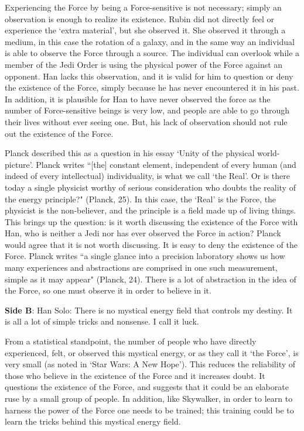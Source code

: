 \documentclass[11pt, oneside]{article}
\begin{document}
\par Experiencing the Force by being a Force-sensitive is not necessary; simply an observation is enough to realize its existence. Rubin did not directly feel or experience the `extra material', but she observed it. She observed it through a medium, in this case the rotation of a galaxy, and in the same way an individual is able to observe the Force through a source. The individual can overlook while a member of the Jedi Order is using the physical power of the Force against an opponent. Han lacks this observation, and it is valid for him to question or deny the existence of the Force, simply because he has never encountered it in his past. In addition, it is plausible for Han to have never observed the force as the number of Force-sensitive beings is very low, and people are able to go through their lives without ever seeing one. But, his lack of observation should not rule out the existence of the Force.

\par Planck described this as a question in his essay `Unity of the physical world-picture'. Planck writes ``[the] constant element, independent of every human (and indeed of every intellectual) individuality, is what we call `the Real'. Or is there today a single physicist worthy of serious consideration who doubts the reality of the energy principle?" (Planck, 25). In this case, the `Real' is the Force, the physicist is the non-believer, and the principle is a field made up of living things. This brings up the question: is it worth discussing the existence of the Force with Han, who is neither a Jedi nor has ever observed the Force in action? Planck would agree that it is not worth discussing. It is easy to deny the existence of the Force. Planck writes ``a single glance into a precision laboratory shows us how many experiences and abstractions are comprised in one such measurement, simple as it may appear" (Planck, 24). There is a lot of abstraction in the idea of the Force, so one must observe it in order to believe in it.

\newpage 

\noindent \textbf{Side B}: Han Solo: There is no mystical energy field that controls my destiny. It is all a lot of simple tricks and nonsense. I call it luck. 

\par From a statistical standpoint, the number of people who have directly experienced, felt, or observed this mystical energy, or as they call it `the Force', is very small (as noted in `Star Wars: A New Hope'). This reduces the reliability of those who believe in the existence of the Force and it increases doubt. It questions the existence of the Force, and suggests that it could be an elaborate ruse by a small group of people. In addition, like Skywalker, in order to learn to harness the power of the Force one needs to be trained; this training could be to learn the tricks behind this mystical energy field.
\end{document}
